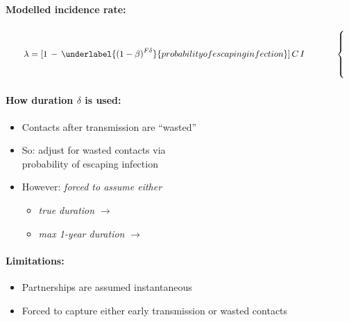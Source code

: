 \newcommand{\symdef}[2]{\parbox{1em}{\centering\ensuremath#1}: #2}
\paragraph[]{Modelled incidence rate:}
\baselineskip
\begin{minipage}{.45\linewidth}
  \begin{equation*}
    \qquad
    \lambda = [1\,-\,{\underlabel{{(1 - \beta)}^{F\delta}}{probability of escaping infection}}]\,C\,I
    \qquad\quad\enspace\begin{cases}\\[10ex]\end{cases}
  \end{equation*}
\end{minipage}
\begin{minipage}{.55\linewidth}\vskip0pt
\end{minipage}
\paragraph{How duration $\delta$ is used:}
\begin{minipage}[t]{.52\linewidth}
  \begin{itemize}
    \item Contacts after transmission are \textcolor{waste}{``wasted''}
    \item So: adjust for wasted contacts via\\
          probability of escaping infection
    \item However: \emph{forced to assume either}
    \begin{itemize}
      \item \emph{true duration} $\rightarrow$ 
      \item \emph{max 1-year duration} $\rightarrow$ 
    \end{itemize}
  \end{itemize}
\end{minipage}
\begin{minipage}[t]{.48\linewidth}
  \baselineskip
  \quad
\end{minipage}
\paragraph{Limitations:}
\begin{itemize}
  \item Partnerships are assumed instantaneous
  \item Forced to capture either early transmission or wasted contacts
\end{itemize}
